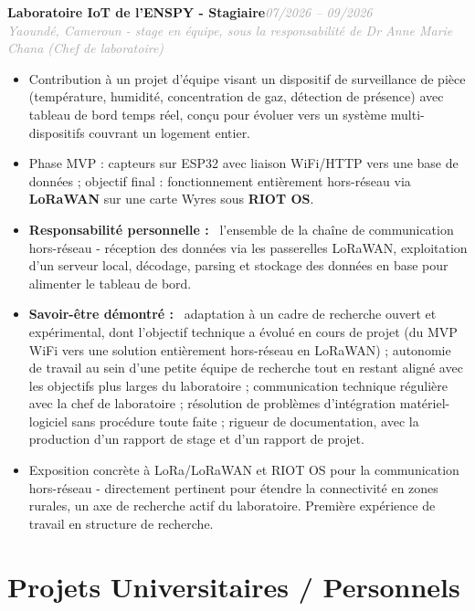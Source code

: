 \documentclass[10pt, a4paper]{article}
\newcommand{\entryhead}[2]{%
  \noindent\textbf{#1}\hfill{\small\textit{\textcolor{darkgray}{#2}}}\\[-4pt]%
}
\newcommand{\entrysub}[1]{%
  {\small\textit{\textcolor{darkgray}{#1}}}\\[2pt]%
}
\newcommand{\blabel}[1]{\textbf{#1}\ }
\begin{document}
\entryhead{Laboratoire IoT de l'ENSPY \normalfont\small- Stagiaire}{07/2026 -- 09/2026}
\entrysub{Yaoundé, Cameroun - stage en équipe, sous la responsabilité de Dr Anne Marie Chana (Chef de laboratoire)}
\begin{itemize}
  \item Contribution à un projet d'équipe visant un dispositif de surveillance de pièce
        (température, humidité, concentration de gaz, détection de présence) avec tableau de
        bord temps réel, conçu pour évoluer vers un système multi-dispositifs couvrant un
        logement entier.
  \item Phase MVP : capteurs sur ESP32 avec liaison WiFi/HTTP vers une base de données ;
        objectif final : fonctionnement entièrement hors-réseau via \textbf{LoRaWAN} sur une
        carte Wyres sous \textbf{RIOT OS}.
  \item \blabel{Responsabilité personnelle :} l'ensemble de la chaîne de communication
        hors-réseau - réception des données via les passerelles LoRaWAN, exploitation d'un
        serveur local, décodage, parsing et stockage des données en base pour alimenter le
        tableau de bord.
  \item \blabel{Savoir-être démontré :} adaptation à un cadre de recherche ouvert et
        expérimental, dont l'objectif technique a évolué en cours de projet (du MVP WiFi vers
        une solution entièrement hors-réseau en LoRaWAN) ; autonomie de travail au sein d'une
        petite équipe de recherche tout en restant aligné avec les objectifs plus larges du
        laboratoire ; communication technique régulière avec la chef de laboratoire ; résolution
        de problèmes d'intégration matériel-logiciel sans procédure toute faite ; rigueur de
        documentation, avec la production d'un rapport de stage et d'un rapport de projet.
  \item Exposition concrète à LoRa/LoRaWAN et RIOT OS pour la communication hors-réseau -
        directement pertinent pour étendre la connectivité en zones rurales, un axe de
        recherche actif du laboratoire. Première expérience de travail en structure de
        recherche.
\end{itemize}

\section{Projets Universitaires / Personnels}
\end{document}
